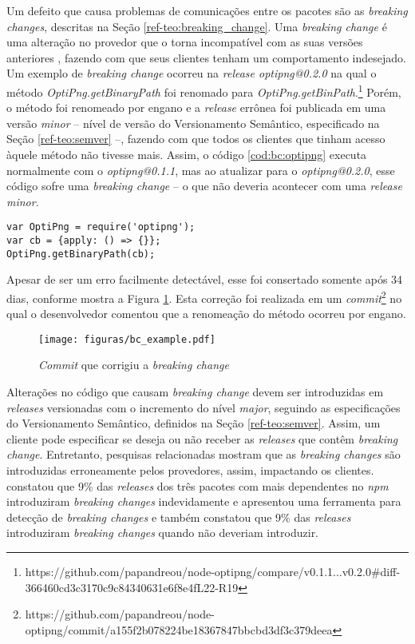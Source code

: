 Um defeito que causa problemas de comunicações entre os pacotes são as \textit{breaking changes}, descritas na Seção \ref{ref-teo:breaking_change}. Uma \textit{breaking change} é uma alteração no provedor que o torna incompatível com as suas versões anteriores \cite{intro:break_change}, fazendo com que seus clientes tenham um comportamento indesejado. Um exemplo de \textit{breaking change} ocorreu na \textit{release optipng@0.2.0} na qual o método \textit{OptiPng.getBinaryPath} foi renomado para \textit{OptiPng.getBinPath}.\footnote{https://github.com/papandreou/node-optipng/compare/v0.1.1...v0.2.0\#diff-366460cd3c3170c9c84340631e6f8e4fL22-R19} Porém, o método foi renomeado por engano e a \textit{release} errônea foi publicada em uma versão \textit{minor} -- nível de versão do Versionamento Semântico, especificado na Seção \ref{ref-teo:semver} --, fazendo com que todos os clientes que tinham acesso àquele método não tivesse mais. Assim, o código \ref{cod:bc:optipng} executa normalmente com o \textit{optipng@0.1.1}, mas ao atualizar para o \textit{optipng@0.2.0}, esse código sofre uma \textit{breaking change} -- o que não deveria acontecer com uma \textit{release minor}.

\begin{lstlisting}[style=Javascript, label=cod:bc:optipng, caption={Código que sofre \textit{breaking change} do \textit{optipng}}]
var OptiPng = require('optipng');
var cb = {apply: () => {}};
OptiPng.getBinaryPath(cb);
\end{lstlisting}

Apesar de ser um erro facilmente detectável, esse foi consertado somente após 34 dias, conforme mostra a Figura \ref{fig:bc_optipng}. Esta correção foi realizada em um \textit{commit}\footnote{https://github.com/papandreou/node-optipng/commit/a155f2b078224be18367847bbcbd3df3c379deea} no qual o desenvolvedor comentou que a renomeação do método ocorreu por engano.

\begin{figure}
    \centering
    \texttt{[image: figuras/bc\_example.pdf]}
    \caption{\textit{Commit} que corrigiu a \textit{breaking change}}
    \label{fig:bc_optipng}
\end{figure}{}

Alterações no código que causam \textit{breaking change} devem ser introduzidas em \textit{releases} versionadas com o incremento do nível \textit{major}, seguindo as especificações do Versionamento Semântico, definidos na Seção \ref{ref-teo:semver}. Assim, um cliente pode especificar se deseja ou não receber as \textit{releases} que contêm \textit{breaking change}. Entretanto, pesquisas relacionadas mostram que as \textit{breaking changes} são introduzidas erroneamente pelos provedores, assim, impactando os clientes.  constatou que 9\% das \textit{releases} dos três pacotes com mais dependentes no \textit{npm} introduziram \textit{breaking changes} indevidamente e  apresentou uma ferramenta para detecção de \textit{breaking changes} e também constatou que 9\% das \textit{releases} introduziram \textit{breaking changes} quando não deveriam introduzir.

